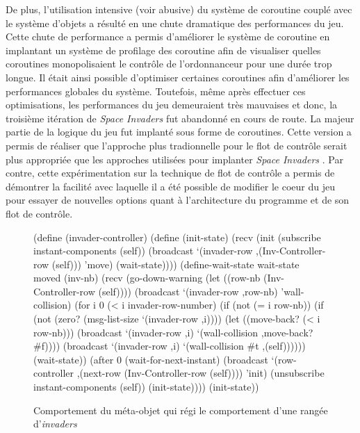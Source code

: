 \documentclass[12pt,twoside,letterpaper,francais]{book}
\newcommand{\si}{{\textit{Space Invaders }}}
\newcommand{\scheme}[1]{\selectlanguage{english}{\tt #1}\selectlanguage{french}}
\begin{document}
De plus, l'utilisation intensive (voir abusive) du système de
coroutine couplé avec le système d'objets a résulté en une chute
dramatique des performances du jeu. Cette chute de performance a
permis d'améliorer le système de coroutine en implantant un système de
profilage des coroutine afin de visualiser quelles coroutines
monopolisaient le contrôle de l'ordonnanceur pour une durée trop
longue. Il était ainsi possible d'optimiser certaines coroutines afin
d'améliorer les performances globales du système. Toutefois, même
après effectuer ces optimisations, les performances du jeu demeuraient
très mauvaises et donc, la troisième itération de \si fut abandonné en
cours de route. La majeur partie de la logique du jeu fut implanté
sous forme de coroutines. Cette version a permis de réaliser que
l'approche plus tradionnelle pour le flot de contrôle serait plus
appropriée que les approches utilisées pour implanter \si. Par contre,
cette expérimentation sur la technique de flot de contrôle a permis de
démontrer la facilité avec laquelle il a été possible de modifier le
coeur du jeu pour essayer de nouvelles options quant à l'architecture
du programme et de son flot de contrôle.\\

\begin{figure}[htb!]
  \begin{schemecode}
(define (invader-controller)
  (define (init-state)
    (recv
     (init
      (subscribe instant-components (self))
      (broadcast `(invader-row ,(Inv-Controller-row (self)))
                 'move)
      (wait-state))))
  (define-wait-state wait-state moved (inv-nb)
    (recv
     (go-down-warning
      (let ((row-nb (Inv-Controller-row (self))))
        (broadcast `(invader-row ,row-nb) 'wall-collision)
        (for i 0 (< i invader-row-number)
             (if (not (= i row-nb))
                 (if (not (zero? (msg-list-size `(invader-row ,i))))
                     (let ((move-back? (< i row-nb)))
                       (broadcast `(invader-row ,i)
                                  `(wall-collision ,move-back? \#f))))
                 (broadcast `(invader-row ,i)
                            `(wall-collision  \#t ,(self))))))
      (wait-state))
     (after 0
            (wait-for-next-instant)
            (broadcast `(row-controller
                         ,(next-row (Inv-Controller-row (self))))
                       'init)
            (unsubscribe instant-components (self))
            (init-state))))
  (init-state))
  \end{schemecode}
  \caption{Comportement du méta-objet \scheme{invader-controller} qui
    régi le comportement d'une rangée d'\textit{invaders}}
  \label{Exp:inv-cnt}
\end{figure}
\end{document}
